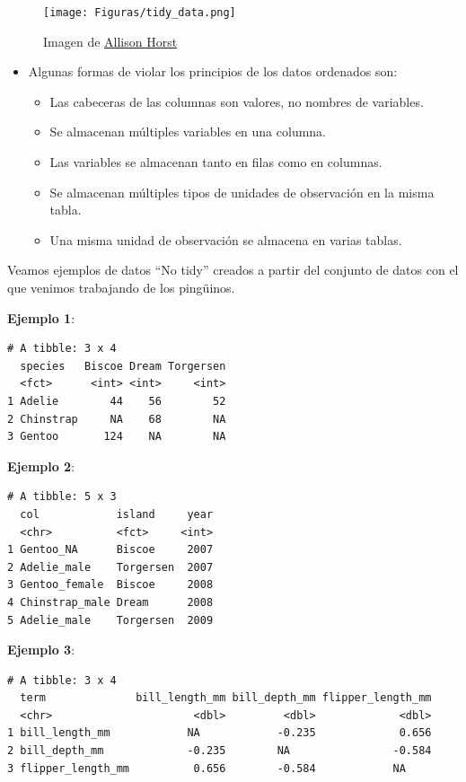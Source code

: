 \documentclass[
  letterpaper,
  DIV=11,
  numbers=noendperiod]{scrreprt}
\begin{document}
\begin{figure}[H]

{\centering \texttt{[image: Figuras/tidy\_data.png]}

}

\caption{Imagen de \href{https://allisonhorst.com}{Allison Horst}}

\end{figure}%

\begin{itemize}
\item
  Algunas formas de violar los principios de los datos ordenados son:

  \begin{itemize}
  \item
    Las cabeceras de las columnas son valores, no nombres de variables.
  \item
    Se almacenan múltiples variables en una columna.
  \item
    Las variables se almacenan tanto en filas como en columnas.
  \item
    Se almacenan múltiples tipos de unidades de observación en la misma
    tabla.
  \item
    Una misma unidad de observación se almacena en varias tablas.
  \end{itemize}
\end{itemize}

Veamos ejemplos de datos ``No tidy'' creados a partir del conjunto de
datos con el que venimos trabajando de los pingüinos.

\textbf{Ejemplo 1}:

\begin{verbatim}
# A tibble: 3 x 4
  species   Biscoe Dream Torgersen
  <fct>      <int> <int>     <int>
1 Adelie        44    56        52
2 Chinstrap     NA    68        NA
3 Gentoo       124    NA        NA
\end{verbatim}

\textbf{Ejemplo 2}:

\begin{verbatim}
# A tibble: 5 x 3
  col            island     year
  <chr>          <fct>     <int>
1 Gentoo_NA      Biscoe     2007
2 Adelie_male    Torgersen  2007
3 Gentoo_female  Biscoe     2008
4 Chinstrap_male Dream      2008
5 Adelie_male    Torgersen  2009
\end{verbatim}

\textbf{Ejemplo 3}:

\begin{verbatim}
# A tibble: 3 x 4
  term              bill_length_mm bill_depth_mm flipper_length_mm
  <chr>                      <dbl>         <dbl>             <dbl>
1 bill_length_mm            NA            -0.235             0.656
2 bill_depth_mm             -0.235        NA                -0.584
3 flipper_length_mm          0.656        -0.584            NA    
\end{verbatim}
\end{document}
